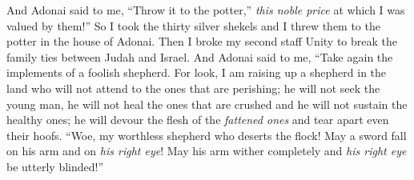 \begin{biblechapter}
\verse And Adonai said to me, “Throw it to the potter,” \textit{this noble price} at which I was valued by them!” So I took the thirty silver shekels and I threw them to the potter in the house of Adonai.
\verse Then I broke my second staff Unity to break the family ties between Judah and Israel.
\verse And Adonai said to me, “Take again the implements of a foolish shepherd.
\verse For look, I am raising up a shepherd in the land who will not attend to the ones that are perishing; he will not seek the young man, he will not heal the ones that are crushed and he will not sustain the healthy ones; he will devour the flesh of the \textit{fattened ones} and tear apart even their hoofs.
\verse “Woe, my worthless shepherd 
who deserts the flock! 
May a sword fall on his arm 
and on \textit{his right eye}! 
May his arm wither completely 
and \textit{his right eye} be utterly blinded!”
\end{biblechapter}

